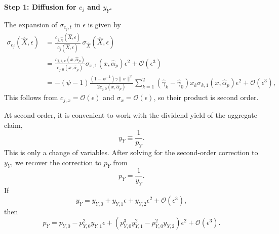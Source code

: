


\noindent\textbf{Step 1: Diffusion for $c_j$ and $y_Y$.}

The expansion of $\sigma_{c_j,t}$ in $\epsilon$ is given by\small
\begin{align}
    \sigma_{c_j}(\hat{X},\epsilon) &= \frac{c_{j,\hat{X}}(\hat{X},\epsilon)}{c_j(\hat{X},\epsilon)} \, \sigma_{\hat{X}}(\hat{X},\epsilon) \nonumber\\
    &= \frac{c_{j,1,x}(x, \hat{\alpha}_p)}{c_{j,0}(x, \hat{\alpha}_p)} \sigma_{x,1}(x, \hat{\alpha}_p) \epsilon^2 +\mathcal{O}(\epsilon^3)\nonumber\\
    &= -(\psi-1)\frac{\left(1-\psi^{-1}\right)\gamma \|\sigma\|^2}{2 c_{j,0}(x, \hat{\alpha}_p)} \sum_{k=1}^2 \left( \hat{\gamma}_k - \hat{\gamma}_0  \right) x_k\sigma_{k,1}(x, \hat{\alpha}_p) \epsilon^2  + \mathcal{O}(\epsilon^3),
\end{align}\normalsize
This follows from $c_{j,x}=\mathcal{O}(\epsilon)$ and $\sigma_x=\mathcal{O}(\epsilon)$, so their product is second order.

At second order, it is convenient to work with the dividend yield of the aggregate claim,
\begin{equation}
    y_Y \equiv \frac{1}{p_Y}.
\end{equation}
This is only a change of variables.
After solving for the second-order correction to $y_Y$, we recover the correction to $p_Y$ from
\begin{equation}
    p_Y = \frac{1}{y_Y}.
\end{equation}
If
\begin{equation}
    y_Y = y_{Y,0} + y_{Y,1}\epsilon + y_{Y,2}\epsilon^2 + \mathcal{O}(\epsilon^3),
\end{equation}
then
\begin{equation}
    p_Y = p_{Y,0} - p_{Y,0}^2 y_{Y,1}\epsilon + \left(p_{Y,0}^3 y_{Y,1}^2 - p_{Y,0}^2 y_{Y,2}\right)\epsilon^2 + \mathcal{O}(\epsilon^3).
\end{equation}

